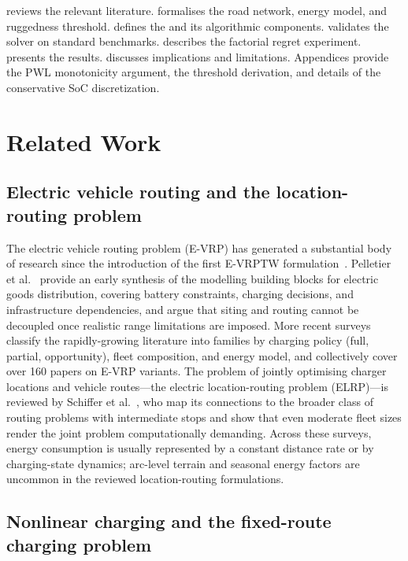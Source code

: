 \documentclass[review,3p,authoryear]{elsarticle}
\newcommand{\ELRP}{\text{GW-ELRP}}
\begin{document}
 reviews the relevant literature.
 formalises the road network, energy model, and ruggedness
threshold.
 defines the \ELRP{} and its algorithmic components.
 validates the solver on standard benchmarks.
 describes the factorial regret experiment.
 presents the results.
 discusses implications and limitations.
Appendices provide the PWL monotonicity argument, the threshold derivation,
and details of the conservative SoC discretization.

\section{Related Work}
\label{sec:related}

\subsection{Electric vehicle routing and the location-routing problem}

The electric vehicle routing problem (E-VRP) has generated a substantial
body of research since the introduction of the first E-VRPTW
formulation~\citep{Schneider2014}.  Pelletier et al.~\citep{Pelletier2016} provide an
early synthesis of the modelling building blocks for electric goods
distribution, covering battery constraints, charging decisions, and
infrastructure dependencies, and argue that siting and routing cannot be
decoupled once realistic range limitations are imposed.  More recent
surveys~\citep{Erdelic2019,Kucukoglu2021,Qin2021} classify the
rapidly-growing literature into families by charging policy (full,
partial, opportunity), fleet composition, and energy model, and
collectively cover over 160 papers on E-VRP variants.  The problem of jointly
optimising charger locations and vehicle routes---the electric
location-routing problem (ELRP)---is reviewed by
Schiffer et al.~\citep{Schiffer2019rev}, who map its connections to the broader class of
routing problems with intermediate stops and show that even moderate
fleet sizes render the joint problem computationally demanding.
Across these surveys, energy consumption is usually represented by a
constant distance rate or by charging-state dynamics; arc-level terrain and
seasonal energy factors are uncommon in the reviewed location-routing
formulations.

\subsection{Nonlinear charging and the fixed-route charging problem}
\end{document}
